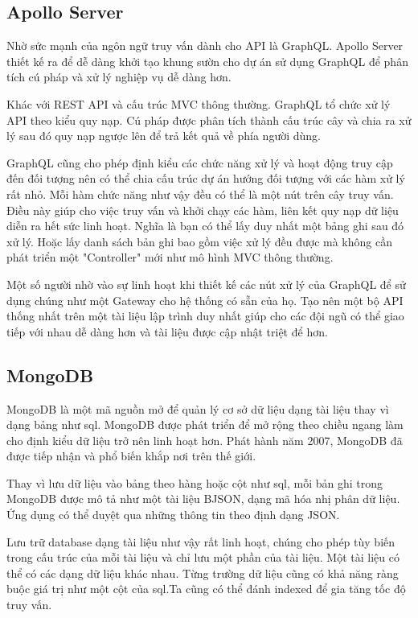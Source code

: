 \documentclass[11pt]{report}
\begin{document}
	\subsection{Apollo Server}
	
	Nhờ sức mạnh của ngôn ngữ truy vấn dành cho API là GraphQL. Apollo Server thiết kế ra để dễ dàng khởi tạo khung sườn cho dự án sử dụng GraphQL để phân tích cú pháp và xử lý nghiệp vụ dễ dàng hơn.
	
	Khác với REST API và cấu trúc MVC thông thường. GraphQL tổ chức xử lý API theo kiểu quy nạp. Cú pháp được phân tích thành cấu trúc cây và chia ra xử lý sau đó quy nạp ngược lên để trả kết quả về phía người dùng.
	
	GraphQL cũng cho phép định kiểu các chức năng xử lý và hoạt động truy cập đến đối tượng nên có thể chia cấu trúc dự án hướng đối tượng với các hàm xử lý rất nhỏ. Mỗi hàm chức năng như vậy đều có thể là một nút trên cây truy vấn. Điều này giúp cho việc truy vấn và khởi chạy các hàm, liên kết quy nạp dữ liệu diễn ra hết sức linh hoạt. Nghĩa là bạn có thể lấy duy nhất một bảng ghi sau đó xử lý. Hoặc lấy danh sách bản ghi bao gồm việc xử lý đều được mà không cần phát triển một "Controller" mới như mô hình MVC thông thường.
	
	Một số người nhờ vào sự linh hoạt khi thiết kế các nút xử lý của GraphQL để sử dụng chúng như một Gateway cho hệ thống có sẵn của họ. Tạo nên một bộ API thống nhất trên một tài liệu lập trình duy nhất giúp cho các đội ngũ có thể giao tiếp với nhau dễ dàng hơn và tài liệu được cập nhật triệt để hơn.
	
	\subsection{MongoDB}
	MongoDB là một mã nguồn mở để quản lý cơ sở dữ liệu dạng tài liệu thay vì dạng bảng như \acrshort{sql}. MongoDB được phát triển để mở rộng theo chiều ngang làm cho định kiểu dữ liệu trở nên linh hoạt hơn. Phát hành năm 2007, MongoDB đã được tiếp nhận và phổ biến khắp nơi trên thế giới.
	
	Thay vì lưu dữ liệu vào bảng theo hàng hoặc cột như \acrshort{sql}, mỗi bản ghi trong MongoDB được mô tả như một tài liệu BJSON, dạng mã hóa nhị phân dữ liệu. Ứng dụng có thể duyệt qua những thông tin theo định dạng JSON.
	
	Lưu trữ database dạng tài liệu như vậy rất linh hoạt, chúng cho phép tùy biến trong cấu trúc của mỗi tài liệu và chỉ lưu một phần của tài liệu. Một tài liệu có thể có các dạng dữ liệu khác nhau. Từng trường dữ liệu cũng có khả năng ràng buộc giá trị như một cột của \acrshort{sql}.Ta cũng có thể đánh indexed để gia tăng tốc độ truy vấn.
	
\end{document}
